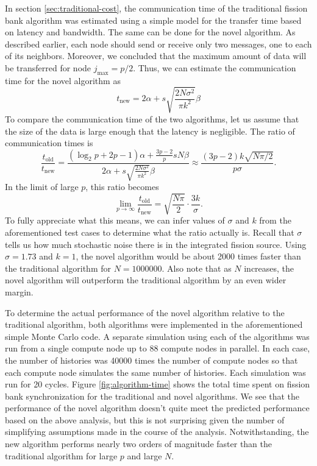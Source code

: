 \documentclass[11pt]{article}
\begin{document}
In section \ref{sec:traditional-cost}, the communication time of the
traditional fission bank algorithm was estimated using a simple model
for the transfer time based on latency and bandwidth. The same can be
done for the novel algorithm. As described earlier, each node should
send or receive only two messages, one to each of its
neighbors. Moreover, we concluded that the maximum amount of data will
be transferred for node $j_{\text{max}} = p/2$. Thus, we can estimate
the communication time for the novel algorithm as
\begin{equation}
  t_{\text{new}} = 2\alpha + s\sqrt{\frac{2N\sigma^2}{\pi k^2}} \beta
\end{equation}
To compare the communication time of the two algorithms, let us assume
that the size of the data is large enough that the latency is
negligible. The ratio of communication times is
\begin{equation}
  \frac{t_{\text{old}}}{t_{\text{new}}} = \frac{\left ( \log_2 p + 2p
    - 1 \right ) \alpha + \frac{3p-2}{p} sN\beta}{2\alpha +
    s\sqrt{\frac{2N\sigma^2}{\pi k^2}} \beta} \approx \frac{ \left (
    3p - 2 \right ) k \sqrt{N\pi/2}}{ p\sigma }.
\end{equation}
In the limit of large $p$, this ratio becomes
\begin{equation}
  \lim_{p\rightarrow\infty} \frac{t_{\text{old}}}{t_{\text{new}}} =
  \sqrt{\frac{N\pi}{2}} \cdot \frac{3k}{\sigma}.
\end{equation}
To fully appreciate what this means, we can infer values of $\sigma$
and $k$ from the aforementioned test cases to determine what the ratio
actually is. Recall that $\sigma$ tells us how much stochastic noise
there is in the integrated fission source. Using $\sigma = 1.73$ and
$k = 1$, the novel algorithm would be about 2000 times faster than the
traditional algorithm for $N = 1000000$. Also note that as $N$
increases, the novel algorithm will outperform the traditional
algorithm by an even wider margin.

To determine the actual performance of the novel algorithm relative to
the traditional algorithm, both algorithms were implemented in the
aforementioned simple Monte Carlo code. A separate simulation using
each of the algorithms was run from a single compute node up to 88
compute nodes in parallel. In each case, the number of histories was
40000 times the number of compute nodes so that each compute node
simulates the same number of histories. Each simulation was run for 20
cycles. Figure \ref{fig:algorithm-time} shows the total time spent on
fission bank synchronization for the traditional and novel
algorithms. We see that the performance of the novel algorithm doesn't
quite meet the predicted performance based on the above analysis, but
this is not surprising given the number of simplifying assumptions made
in the course of the analysis. Notwithstanding, the new algorithm
performs nearly two orders of magnitude faster than the traditional
algorithm for large $p$ and large $N$.
\end{document}
